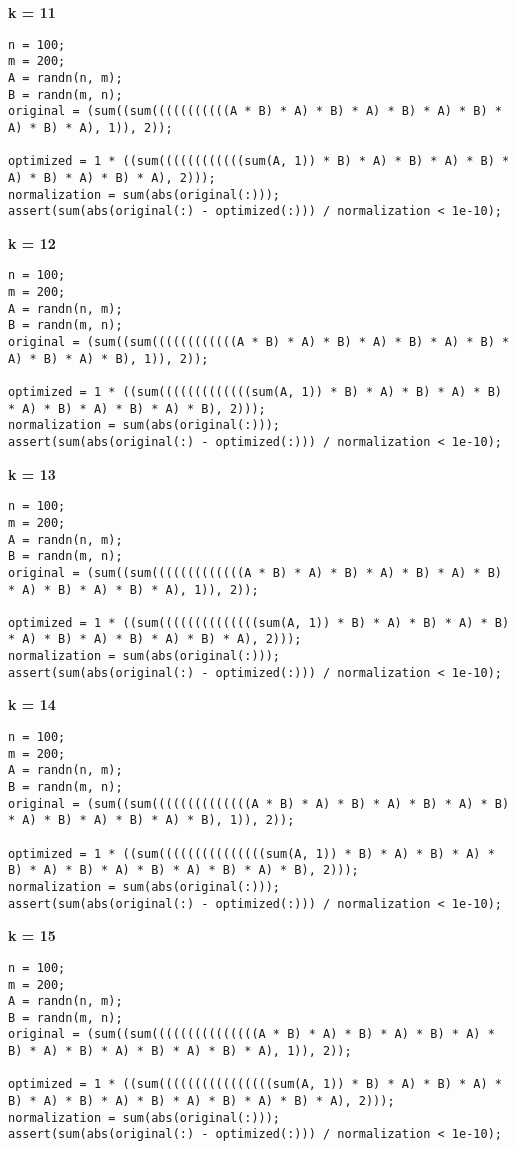 {\bf k = 11}

\begin{lstlisting}
n = 100;
m = 200;
A = randn(n, m);
B = randn(m, n);
original = (sum((sum(((((((((((A * B) * A) * B) * A) * B) * A) * B) * A) * B) * A), 1)), 2));

optimized = 1 * ((sum((((((((((((sum(A, 1)) * B) * A) * B) * A) * B) * A) * B) * A) * B) * A), 2)));
normalization = sum(abs(original(:)));
assert(sum(abs(original(:) - optimized(:))) / normalization < 1e-10);
\end{lstlisting}


{\bf k = 12}

\begin{lstlisting}
n = 100;
m = 200;
A = randn(n, m);
B = randn(m, n);
original = (sum((sum((((((((((((A * B) * A) * B) * A) * B) * A) * B) * A) * B) * A) * B), 1)), 2));

optimized = 1 * ((sum(((((((((((((sum(A, 1)) * B) * A) * B) * A) * B) * A) * B) * A) * B) * A) * B), 2)));
normalization = sum(abs(original(:)));
assert(sum(abs(original(:) - optimized(:))) / normalization < 1e-10);
\end{lstlisting}


{\bf k = 13}

\begin{lstlisting}
n = 100;
m = 200;
A = randn(n, m);
B = randn(m, n);
original = (sum((sum(((((((((((((A * B) * A) * B) * A) * B) * A) * B) * A) * B) * A) * B) * A), 1)), 2));

optimized = 1 * ((sum((((((((((((((sum(A, 1)) * B) * A) * B) * A) * B) * A) * B) * A) * B) * A) * B) * A), 2)));
normalization = sum(abs(original(:)));
assert(sum(abs(original(:) - optimized(:))) / normalization < 1e-10);
\end{lstlisting}


{\bf k = 14}

\begin{lstlisting}
n = 100;
m = 200;
A = randn(n, m);
B = randn(m, n);
original = (sum((sum((((((((((((((A * B) * A) * B) * A) * B) * A) * B) * A) * B) * A) * B) * A) * B), 1)), 2));

optimized = 1 * ((sum(((((((((((((((sum(A, 1)) * B) * A) * B) * A) * B) * A) * B) * A) * B) * A) * B) * A) * B), 2)));
normalization = sum(abs(original(:)));
assert(sum(abs(original(:) - optimized(:))) / normalization < 1e-10);
\end{lstlisting}


{\bf k = 15}

\begin{lstlisting}
n = 100;
m = 200;
A = randn(n, m);
B = randn(m, n);
original = (sum((sum(((((((((((((((A * B) * A) * B) * A) * B) * A) * B) * A) * B) * A) * B) * A) * B) * A), 1)), 2));

optimized = 1 * ((sum((((((((((((((((sum(A, 1)) * B) * A) * B) * A) * B) * A) * B) * A) * B) * A) * B) * A) * B) * A), 2)));
normalization = sum(abs(original(:)));
assert(sum(abs(original(:) - optimized(:))) / normalization < 1e-10);
\end{lstlisting}


